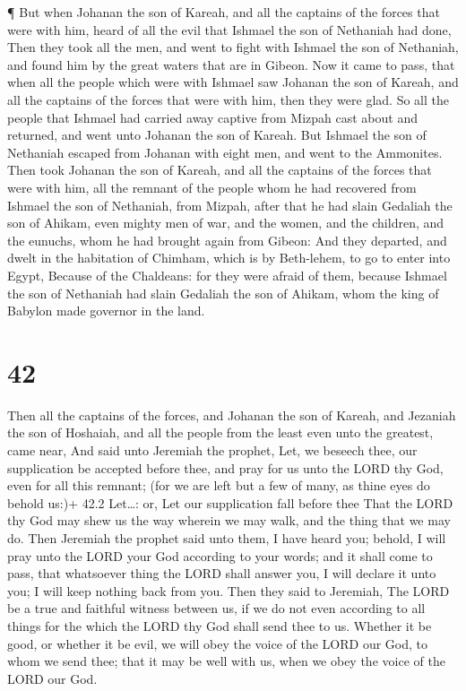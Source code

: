  ¶ But when Johanan the son of Kareah, and all the captains
of the forces that were with him, heard of all the evil that Ishmael the
son of Nethaniah had done,  Then they took all the men, and
went to fight with Ishmael the son of Nethaniah, and found him by the
great waters that are in Gibeon.  Now it came to pass, that
when all the people which were with Ishmael saw Johanan the son of
Kareah, and all the captains of the forces that were with him, then they
were glad.  So all the people that Ishmael had carried away
captive from Mizpah cast about and returned, and went unto Johanan the
son of Kareah.  But Ishmael the son of Nethaniah escaped
from Johanan with eight men, and went to the Ammonites. 
Then took Johanan the son of Kareah, and all the captains of the forces
that were with him, all the remnant of the people whom he had recovered
from Ishmael the son of Nethaniah, from Mizpah, after that he had slain
Gedaliah the son of Ahikam, even mighty men of war, and the women, and
the children, and the eunuchs, whom he had brought again from Gibeon:
 And they departed, and dwelt in the habitation of Chimham,
which is by Beth-lehem, to go to enter into Egypt,  Because
of the Chaldeans: for they were afraid of them, because Ishmael the son
of Nethaniah had slain Gedaliah the son of Ahikam, whom the king of
Babylon made governor in the land.

\hypertarget{section-41}{%
\section{42}\label{section-41}}

 Then all the captains of the forces, and Johanan the son of
Kareah, and Jezaniah the son of Hoshaiah, and all the people from the
least even unto the greatest, came near,  And said unto
Jeremiah the prophet, Let, we beseech thee, our supplication be accepted
before thee, and pray for us unto the LORD thy God, even for all this
remnant; (for we are left but a few of many, as thine eyes do behold
us:)+ 42.2 Let\ldots: or, Let our supplication fall before thee
 That the LORD thy God may shew us the way wherein we may
walk, and the thing that we may do.  Then Jeremiah the
prophet said unto them, I have heard you; behold, I will pray unto the
LORD your God according to your words; and it shall come to pass, that
whatsoever thing the LORD shall answer you, I will declare it unto you;
I will keep nothing back from you.  Then they said to
Jeremiah, The LORD be a true and faithful witness between us, if we do
not even according to all things for the which the LORD thy God shall
send thee to us.  Whether it be good, or whether it be evil,
we will obey the voice of the LORD our God, to whom we send thee; that
it may be well with us, when we obey the voice of the LORD our God.

